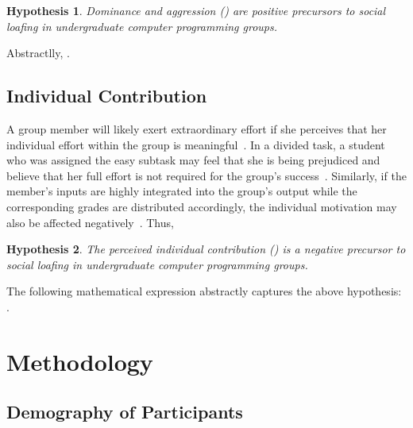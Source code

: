 \documentclass[a4paper,a4paper,BCOR12mm,12pt,abstracton,pointednumbers,tablecaptionabove,footinclude,halfparskip,normalheadings,]{scrartcl}
\newtheorem{hypothesis}{Hypothesis}
\begin{document}
\begin{hypothesis}
Dominance and aggression () are positive precursors to social loafing in undergraduate computer programming groups.\label{hyp:dominance}
\end{hypothesis}

Abstractlly, .

\subsection{Individual Contribution}

A group member will likely exert extraordinary effort if she perceives that her individual effort within the group is meaningful~\citep{Karau93}. In a divided task, a student who was assigned the easy subtask may feel that she is being prejudiced and believe that her full effort is not required for the group's success~\citep{Liden04}. Similarly, if the member's inputs are highly integrated into the group's output while the corresponding grades are distributed accordingly, the individual motivation may also be affected negatively~\citep{Lawler71}. Thus,

\begin{hypothesis}
The perceived individual contribution () is a negative precursor to social loafing in undergraduate computer programming groups.\label{hyp:contrib}
\end{hypothesis}

The following mathematical expression abstractly captures the above hypothesis: .

\section{Methodology}\label{sec:method}

\subsection{Demography of Participants}
\end{document}
